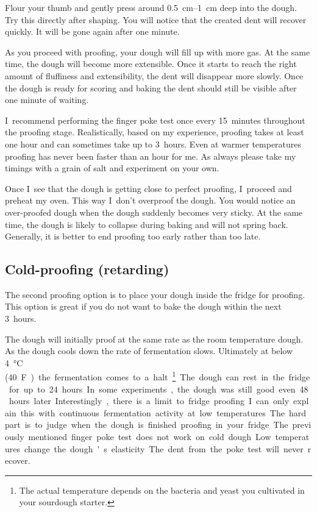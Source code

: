 Flour your thumb and gently press around \qtyrange{0.5}{1}{cm} deep into the
dough.  Try this directly after shaping. You will notice that the created dent
will recover quickly. It will be gone again after one minute.

As you proceed with proofing, your dough will fill up with more gas. At the
same time, the dough will become more extensible. Once it starts to reach the
right amount of fluffiness and extensibility, the dent will disappear more
slowly.  Once the dough is ready for scoring and baking the dent should still
be visible after one minute of waiting.

I~recommend performing the finger poke test once every 15~minutes throughout
the proofing stage. Realistically, based on my experience, proofing takes at least
one hour and can sometimes take up to 3~hours. Even at warmer temperatures proofing
has never been faster than an hour for me. As always please take my timings with
a grain of salt and experiment on your own.

Once I~see that the dough is getting close to perfect proofing, I~proceed and
preheat my oven. This way I~don't overproof the dough. You would notice an
over-proofed dough when the dough suddenly becomes very sticky. At the same
time, the dough is likely to collapse during baking and will not spring back.
Generally, it is better to end proofing too early rather than too late.

\subsection{Cold-proofing (retarding)}

The second proofing option is to place your dough inside the fridge for
proofing. This option is great if you do not want to bake the dough
within the next 3~hours.

The dough will initially proof at the same rate as the room temperature dough.
As the dough cools down the rate of fermentation slows. Ultimately at below
\qty{4}{\degreeCelsius} (\qty{40}F) the fermentation comes to a halt\footnote{The actual temperature
depends on the bacteria and yeast you cultivated in your sourdough
starter.}. The dough can rest in the fridge for up to 24~hours. In some
experiments, the dough was still good even 48~hours later. Interestingly,
there is a limit to fridge proofing. I~can only explain this with continuous
fermentation activity at low temperatures.

The hard part is to judge when the dough is finished proofing in your fridge.
The previously mentioned finger poke test does not work on cold dough. Low
temperatures change the dough's elasticity. The dent from the poke test
will never recover.

